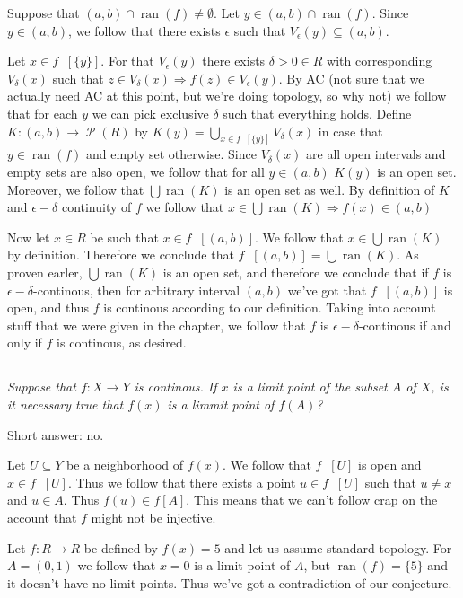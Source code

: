 \documentclass[11pt,oneside,titlepage]{book}
\DeclareMathOperator \pow {\mathcal {P}}
\DeclareMathOperator \inv {^{-1}}
\DeclareMathOperator \ra {\Rightarrow}
\DeclareMathOperator \ran {ran}
\newcommand{\set}[1]{\{ #1 \}}
\begin{document}
Suppose that $(a, b) \cap \ran(f) \neq \emptyset$. Let $y \in (a, b) \cap \ran(f)$.
Since $y \in (a, b)$, we follow that there exists $\epsilon$ such that
$V_\epsilon(y) \subseteq (a, b)$. 

Let $x \in f\inv[\set{y}]$.  For that $V_\epsilon(y)$ there exists $\delta > 0 \in R$
with corresponding  $V_\delta(x)$ such that $z \in V_\delta(x) \ra f(z) \in V_\epsilon(y)$.
By AC (not sure that we actually need AC
at this point, but we're doing topology, so why not) we follow that for each $y$
we can pick exclusive $\delta$ such that everything holds. 
Define $K: (a, b) \to \pow(R)$ by
$K(y) = \bigcup_{x \in f\inv[\set{y}]} {V_\delta(x)}$ in case that $y \in \ran(f)$ and
empty set otherwise.
Since $V_\delta(x)$ are all open intervals and empty sets are also open,
we follow that for all $y \in (a, b)$ $K(y)$ is an open set. Moreover, we follow that
$\bigcup{\ran(K)}$ is an open set as well. By definition of $K$ and $\epsilon-\delta$
continuity of $f$ we follow that $x \in \bigcup{\ran(K)} \ra f(x) \in (a, b)$ 

Now let $x \in R$ be such that $x \in f\inv[(a, b)]$. We follow that $x \in \bigcup{\ran(K)}$
by definition. Therefore we conclude that $f\inv[(a, b)] = \bigcup{\ran(K)}$.
As proven earler, $\bigcup{\ran(K)}$ is an open set, and therefore we conclude that
if $f$ is $\epsilon-\delta$-continous, then  for arbitrary interval $(a, b)$ we've got
that $f\inv[(a, b)]$ is open, and thus $f$ is continous according to our definition.
Taking into account stuff that we were given in the chapter, we follow that
$f$ is $\epsilon-\delta$-continous if and only if $f$ is continous, as desired.

\subsection{}

\textit{Suppose that $f: X \to Y$ is continous. If $x$ is a limit point of the
  subset $A$ of $X$, is it necessary true that $f(x)$ is a limmit point of $f(A)$?}

Short answer: no.

Let $U \subseteq Y$ be a neighborhood of $f(x)$. We follow that $f\inv[U]$ is open and
$x \in f\inv[U]$. Thus we follow that there exists a point $u \in f\inv[U]$
such that $u \neq x$ and $u \in A$. Thus $f(u) \in f[A]$. This means that we can't
follow crap on the account that $f$ might not be injective.

Let $f: R \to R$ be defined by $f(x) = 5$ and let us assume standard topology.
For $A = (0, 1)$ we follow that $x = 0$ is a limit point of $A$, but $\ran(f) = \set{5}$
and it doesn't have no limit points. Thus we've got a contradiction of our conjecture.
\end{document}
